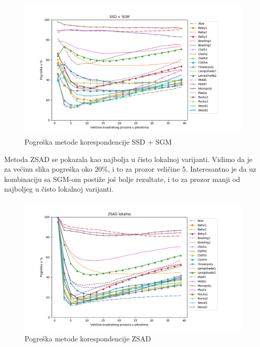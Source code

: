 \documentclass[utf8, zavrsni, numeric]{fer}
\begin{document}
\begin{figure}[H]
  \centering
  \includegraphics[width=13cm]{img/SSD_sgm_middlebury.png}
  \caption{Pogreška metode korespondencije SSD + SGM}
  \label{fig:SSD-sgm-error}
\end{figure}

Metoda ZSAD se pokazala kao najbolja u čisto lokalnoj varijanti. Vidimo da je
za većinu slika pogreška oko 20\%, i to za prozor veličine 5. Interesantno je da
uz kombinaciju sa SGM-om postiže još bolje rezultate, i to za prozor manji od
najboljeg u čisto lokalnoj varijanti.

\begin{figure}[H]
  \centering
  \includegraphics[width=13cm]{img/ZSAD_lokalno_middlebury.png}
  \caption{Pogreška metode korespondencije ZSAD}
  \label{fig:ZSAD-error}
\end{figure}
\end{document}
